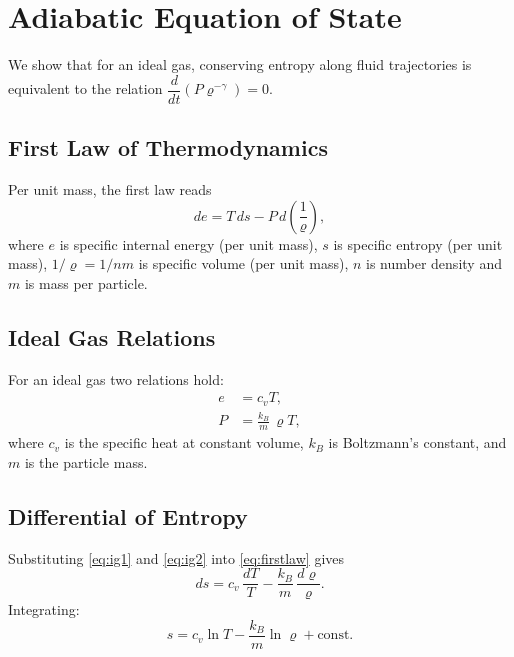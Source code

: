\chapter{Adiabatic Equation of State}
\label{chap: App. Adiabatic Equation of State}
 
We show that for an ideal gas, conserving entropy along fluid trajectories is
equivalent to the relation $\dfrac{d}{dt}(P \varrho^{-\gamma})=0$.
 
\section{First Law of Thermodynamics}
 
Per unit mass, the first law reads
\begin{equation}
    de = T\,ds - P\,d\!\left(\frac{1}{ \varrho}\right),
    \label{eq:firstlaw}
\end{equation}
where $e$ is specific internal energy (per unit mass), $s$ is specific entropy (per unit mass), $1/ \varrho = 1/ n m$
is specific volume (per unit mass), $n$ is number density and $m$ is mass per particle.
 
\section{Ideal Gas Relations}
 
For an ideal gas two relations hold:
\begin{align}
    e &= c_v T, \label{eq:ig1}\\
    P &= \frac{k_B}{m}\, \varrho T, \label{eq:ig2}
\end{align}
where $c_v$ is the specific heat at constant volume, $k_B$ is Boltzmann's
constant, and $m$ is the particle mass.
 
\section{Differential of Entropy}
 
Substituting \eqref{eq:ig1} and \eqref{eq:ig2} into \eqref{eq:firstlaw} gives
\begin{equation}
    ds = c_v\,\frac{dT}{T} - \frac{k_B}{m}\,\frac{d \varrho}{ \varrho}.
    \label{eq:ds}
\end{equation}
Integrating:
\begin{equation}
    s = c_v \ln T - \frac{k_B}{m}\ln \varrho + \text{const}.
    \label{eq:s_T}
\end{equation}
 
